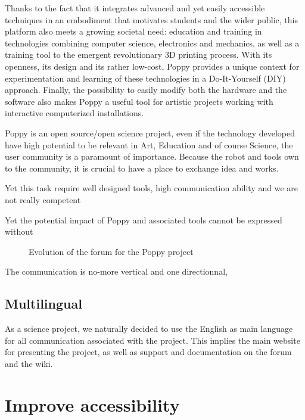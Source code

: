 Thanks to the fact that it integrates advanced and yet easily accessible techniques in an embodiment that motivates students and the wider public, this platform also meets a growing societal need: education and training in technologies combining computer science, electronics and mechanics, as well as a training tool to the emergent revolutionary 3D printing process. With its openness, its design and its rather low-cost, Poppy provides a unique context for experimentation and learning of these technologies in a Do-It-Yourself (DIY) approach.
Finally, the possibility to easily modify both the hardware and the software also makes Poppy a useful tool for artistic projects working with interactive computerized installations.

Poppy is an open source/open science project, even if the technology developed have high potential to be relevant in Art, Education and of course Science, the user community is a paramount of importance. Because the robot and tools own to the community, it is crucial to have a place to exchange idea and works.

Yet this task require well designed tools, high communication ability and we are not really competent

Yet the potential impact of Poppy and associated tools cannot be expressed without


\begin{figure}[tb]
\centering
    \hfil
    \caption{Evolution of the forum for the Poppy project}
    \label{fig:poppy_forum}
\end{figure}



The communication is no-more vertical and one directionnal,


\subsection{Multilingual} %

As a science project, we naturally decided to use the English as main language for all communication associated with the project. This implies the main website for presenting the project, as well as support and documentation on the forum and the wiki.



\section{Improve accessibility} %


